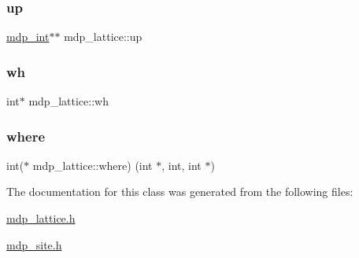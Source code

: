 \subsubsection{\texorpdfstring{up}{up}}
{\footnotesize\ttfamily \hyperlink{mdp__global__vars_8h_aaa1ad9d0dcd2124aa5af0120d9954174}{mdp\+\_\+int}$\ast$$\ast$ mdp\+\_\+lattice\+::up}

\mbox{\label{classmdp__lattice_adeee5743b0c437ec58026c98a0a3229f}} 
\subsubsection{\texorpdfstring{wh}{wh}}
{\footnotesize\ttfamily int$\ast$ mdp\+\_\+lattice\+::wh}

\mbox{\label{classmdp__lattice_a36603bfc98689484753d00c3e1a46a47}} 
\subsubsection{\texorpdfstring{where}{where}}
{\footnotesize\ttfamily int($\ast$ mdp\+\_\+lattice\+::where) (int $\ast$, int, int $\ast$)}



The documentation for this class was generated from the following files\+:\begin{DoxyCompactItemize}
\item 
\hyperlink{mdp__lattice_8h}{mdp\+\_\+lattice.\+h}\item 
\hyperlink{mdp__site_8h}{mdp\+\_\+site.\+h}\end{DoxyCompactItemize}
